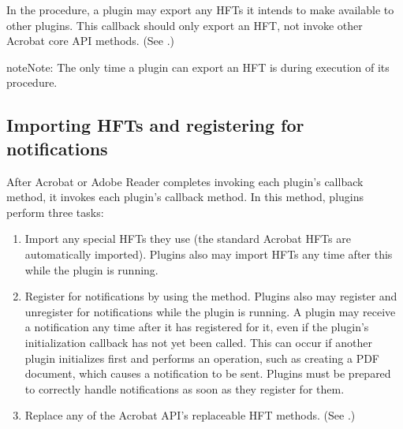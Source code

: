 \documentclass[letterpaper,12pt,english,openany,oneside]{sphinxmanual}
\begin{document}
In the  procedure, a plugin may export any HFTs it intends to make available to other plugins. This callback should only export an HFT, not invoke other Acrobat core API methods. (See .)

\begin{sphinxadmonition}{note}{Note:}
The only time a plugin can export an HFT is during execution of its  procedure.
\end{sphinxadmonition}


\subsection{Importing HFTs and registering for notifications}
\label{\detokenize{Plugins_Pimech:importing-hfts-and-registering-for-notifications}}
After Acrobat or Adobe Reader completes invoking each plugin’s  callback method, it invokes each plugin’s  callback method. In this method, plugins perform three tasks:
\begin{enumerate}
%
\item {} 
Import any special HFTs they use (the standard Acrobat HFTs are automatically imported). Plugins also may import HFTs any time after this while the plugin is running.

\item {} 
Register for notifications by using the  method. Plugins also may register and unregister for notifications while the plugin is running. A plugin may receive a notification any time after it has registered for it, even if the plugin’s initialization callback has not yet been called. This can occur if another plugin initializes first and performs an operation, such as creating a PDF document, which causes a notification to be sent. Plugins must be prepared to correctly handle notifications as soon as they register for them.

\item {} 
Replace any of the Acrobat API’s replaceable HFT methods. (See .)

\end{enumerate}
\end{document}
